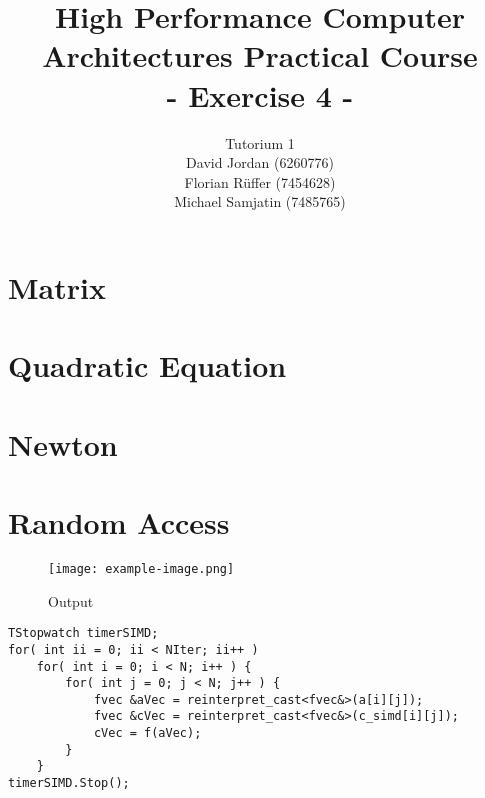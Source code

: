 \documentclass{article}
\title{\textbf{High Performance Computer Architectures Practical Course \\ - Exercise 4 -} \\[10mm]}
\author{Tutorium 1 \\[10mm] David Jordan (6260776) \\[1mm] Florian Rüffer (7454628) \\[1mm] Michael Samjatin (7485765) \\[10mm]}
\begin{document}
\maketitle
\newpage
\section{Matrix}
\section{Quadratic Equation}
\section{Newton}
\section{Random Access}

\begin{figure}[H]
    \centering
    \texttt{[image: example-image.png]} 
    \caption{Output}
    \label{fig:example}
\end{figure}






\begin{lstlisting}[caption=Matrix.cpp]
TStopwatch timerSIMD;
for( int ii = 0; ii < NIter; ii++ )
    for( int i = 0; i < N; i++ ) {
        for( int j = 0; j < N; j++ ) {
            fvec &aVec = reinterpret_cast<fvec&>(a[i][j]);
            fvec &cVec = reinterpret_cast<fvec&>(c_simd[i][j]);
            cVec = f(aVec);
        }
    }
timerSIMD.Stop();
\end{lstlisting}
\end{document}
